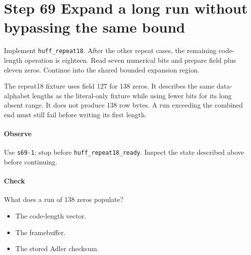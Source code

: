 \section{Step 69 Expand a long run without bypassing the same bound}\label{png-huff-s69}
Implement \texttt{huff\_repeat18}. After the other repeat cases, the remaining code-length operation is eighteen. Read seven numerical bits and prepare field plus eleven zeros. Continue into the shared bounded expansion region.

The repeat18 fixture uses field 127 for 138 zeros. It describes the same data-alphabet lengths as the literal-only fixture while using fewer bits for its long absent range. It does not produce 138 row bytes. A run exceeding the combined end must still fail before writing its first length.

\paragraph{Observe} Use \texttt{s69-1}; stop before \texttt{huff\_repeat18\_ready}. Inspect the state described above before continuing.

\paragraph{Check} What does a run of 138 zeros populate?
\begin{itemize}
\item[A.] The code-length vector.
\item[B.] The framebuffer.
\item[C.] The stored Adler checksum.
\end{itemize}
